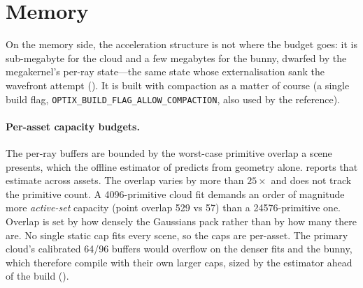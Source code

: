 \section{Memory}
\label{sec:opt-memory}

On the memory side, the acceleration structure is not where the budget goes: it is
sub-megabyte for the cloud and a few megabytes for the bunny, dwarfed by the megakernel's
per-ray state---the same state whose externalisation sank the wavefront attempt
(). It is built
with compaction as a matter of course (a single
build flag, \texttt{OPTIX\_BUILD\_FLAG\_ALLOW\_COMPACTION}, also used by the reference).

\paragraph{Per-asset capacity budgets.} The per-ray buffers are bounded by the worst-case primitive
overlap a scene presents, which the offline estimator of  predicts from geometry
alone.  reports that estimate across assets. The overlap varies by more than
$25\times$ and does not track the primitive count. A \num{4096}-primitive cloud fit
demands an order of magnitude more \emph{active-set} capacity (point overlap \num{529} vs \num{57}) than
a \num{24576}-primitive one. Overlap is set by
how densely the Gaussians pack rather than by how many there are. No single static cap fits every scene,
so the caps are per-asset. The primary cloud's calibrated \num{64}/\num{96} buffers would
overflow on the denser fits and the bunny, which therefore compile with their own larger caps,
sized by the estimator ahead of the build ().


